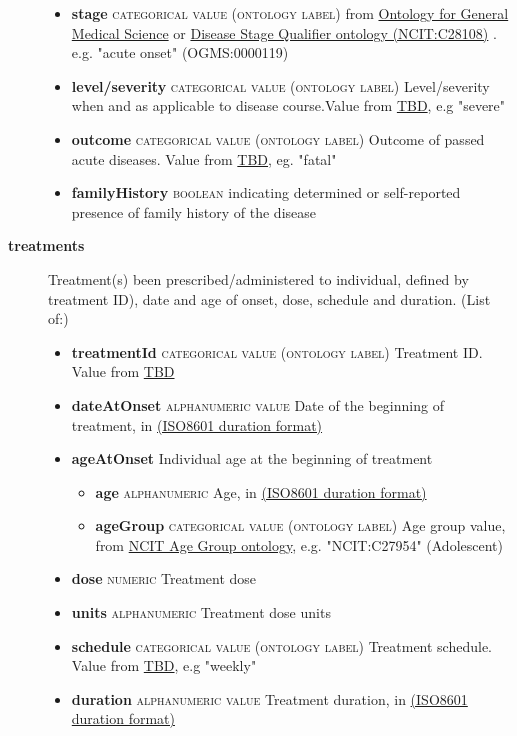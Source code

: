 \documentclass[a4paper, 10pt]{article}        %
\begin{document}
\begin{description}
\begin{itemize}
\begin{itemize}
			\end{itemize}
			\item[]  \textbf{stage} {\textsc{categorical value (ontology label)}} from  \href{link}{Ontology for General Medical Science} or  \href{link}{Disease Stage Qualifier ontology (NCIT:C28108)} . e.g. "acute onset" (OGMS:0000119)
			\item[] \textbf{level/severity} {\textsc{categorical value (ontology label)}} Level/severity when and as applicable to disease course.Value from \href{link}{TBD}, e.g "severe"
			\item[]  \textbf{outcome} {\textsc{categorical value (ontology label)}} Outcome of passed acute diseases. Value from \href{link}{TBD}, eg. "fatal" 
			\item[] \textbf{familyHistory} {\textsc{boolean}} indicating determined or self-reported presence of family history of the disease
	\end{itemize}

	\item[\textbf{treatments}] Treatment(s) been prescribed/administered to individual, defined by treatment ID), date and age of onset, dose, schedule and duration. (List of:)
	\begin{itemize}
			\item[] \textbf{treatmentId} {\textsc{categorical value (ontology label)}} Treatment ID. Value from \href{link}{TBD}
			\item[] \textbf{dateAtOnset} {\textsc{alphanumeric value}} Date of the beginning of treatment, in \href{link}{(ISO8601 duration format)}  
			\item[] \textbf{ageAtOnset} Individual age at the beginning of treatment
			\begin{itemize}
			\item[] \textbf{age} {\textsc{alphanumeric}} Age, in \href{link}{(ISO8601 duration format)}  
			\item[] \textbf{ageGroup} {\textsc{categorical value (ontology label)}} Age group value, from \href{link}{NCIT Age Group ontology}, e.g. "NCIT:C27954" (Adolescent)
			\end{itemize}
			\item[] \textbf{dose} {\textsc{numeric}} Treatment dose
			\item[] \textbf{units}  {\textsc{alphanumeric}} Treatment dose units
			\item[] \textbf{schedule} {\textsc{categorical value (ontology label)}} Treatment schedule. Value from \href{link}{TBD}, e.g "weekly"
			\item[] \textbf{duration} {\textsc{alphanumeric value}} Treatment duration, in \href{link}{(ISO8601 duration format)}  
	\end{itemize} 
	

\end{description}
\end{document}
